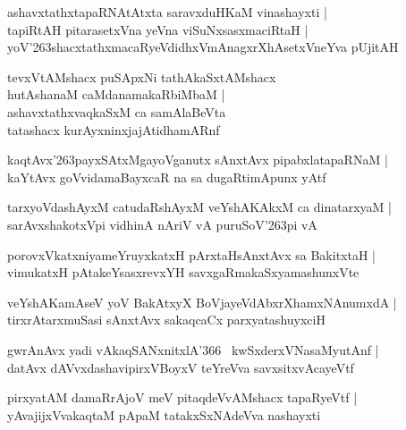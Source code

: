 \documentclass[twoside,12pt,openright]{book}
\def\S{\char'263}
\newcounter{shloka}[chapter]
\begin{document}
\begin{shloka}%
ashavxtathxtapaRNAtAtxta saravxduHKaM vinashayxti |\\
tapiRtAH pitarasetxVna yeVna viSuNxsasxmaciRtaH |\\
yoV\S shacxtathxmacaRyeVdidhxVmAnagxrXhAsetxVneYva pUjitAH 
\end{shloka}

\begin{shloka}%
tevxVtAMshacx puSApxNi tathAkaSxtAMshacx \\
hutAshanaM caMdanamakaRbiMbaM |\\
ashavxtathxvaqkaSxM ca samAlaBeVta \\
tatashacx kurAyxninxjajAtidhamARnf 
\end{shloka}

\begin{shloka}%
kaqtAvx\S payxSAtxMgayoVganutx sAnxtAvx pipabxlatapaRNaM |\\
kaYtAvx goVvidamaBayxcaR na sa dugaRtimApunx yAtf
\end{shloka}

\begin{shloka}%
tarxyoVdashAyxM catudaRshAyxM veYshAKAkxM ca  dinatarxyaM |\\
sarAvxshakotxVpi vidhinA nAriV vA puruSoV\S pi vA 
\end{shloka}

\begin{shloka}%
porovxVkatxniyameYruyxkatxH pArxtaHsAnxtAvx sa BakitxtaH |\\
vimukatxH pAtakeYsasxrevxYH savxgaRmakaSxyamashunxVte
\end{shloka}

\begin{shloka}%
veYshAKamAseV yoV BakAtxyX BoVjayeVdAbxrXhamxNAnumxdA |\\
tirxrAtarxmuSasi sAnxtAvx sakaqcaCx parxyatashuyxciH 
\end{shloka}

\begin{shloka}%
gwrAnAvx yadi vAkaqSANxnitxlA\char'366 ~kwSxderxVNasaMyutAnf |\\
datAvx dAVvxdashavipirxVBoyxV teYreVva savxsitxvAcayeVtf
\end{shloka}

\begin{shloka}%
pirxyatAM damaRrAjoV meV pitaqdeVvAMshacx tapaRyeVtf |\\
yAvajijxVvakaqtaM pApaM tatakxSxNAdeVva nashayxti 
\end{shloka}
\end{document}

